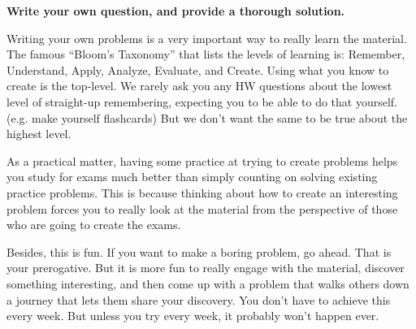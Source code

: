 \documentclass[preview]{standalone}
\begin{document}

{\bf Write your own question, and provide a thorough solution.}

Writing your own problems is a very important way to really learn
the material. The famous ``Bloom's Taxonomy'' that lists the levels of
learning is: Remember, Understand, Apply, Analyze, Evaluate, and
Create. Using what you know to create is the top-level. We rarely ask
you any HW questions about the lowest level of straight-up
remembering, expecting you to be able to do that yourself. (e.g. make
yourself flashcards) But we don't want the same to be true about the
highest level.

As a practical matter, having some practice at trying to create
problems helps you study for exams much better than simply counting on
solving existing practice problems. This is because thinking about how
to create an interesting problem forces you to really look at the
material from the perspective of those who are going to create the
exams. 

Besides, this is fun. If you want to make a boring problem, go
ahead. That is your prerogative. But it is more fun to really engage
with the material, discover something interesting, and then come up
with a problem that walks others down a journey that lets them share
your discovery. You don't have to achieve this every week. But unless
you try every week, it probably won't happen ever. 
\end{document}
